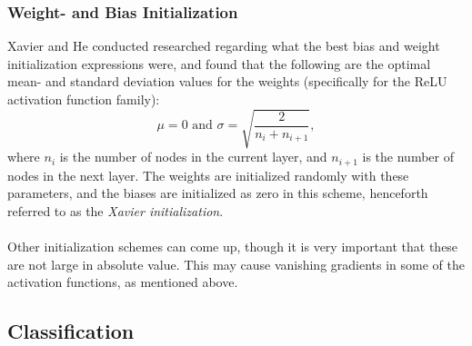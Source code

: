         \subsubsection{Weight- and Bias Initialization}
            Xavier and He \cite{He2015} conducted researched regarding what the best bias and weight initialization expressions were, and found that the following are the optimal mean- and standard deviation values for the weights (specifically for the ReLU activation function family):
            \begin{equation}\label{eq:xavier}
                \mu = 0 \text{ and } \sigma = \sqrt{\frac{2}{n_i+n_{i+1}}},
            \end{equation}
            where $n_i$ is the number of nodes in the current layer, and $n_{i+1}$ is the number of nodes in the next layer. The weights are initialized randomly with these parameters, and the biases are initialized as zero in this scheme, henceforth referred to as the \textit{Xavier initialization}.\\\\
            Other initialization schemes can come up, though it is very important that these are not large in absolute value. This may cause vanishing gradients in some of the activation functions, as mentioned above. 
        
    \subsection{Classification}
        
        
        
    
        
    
        

